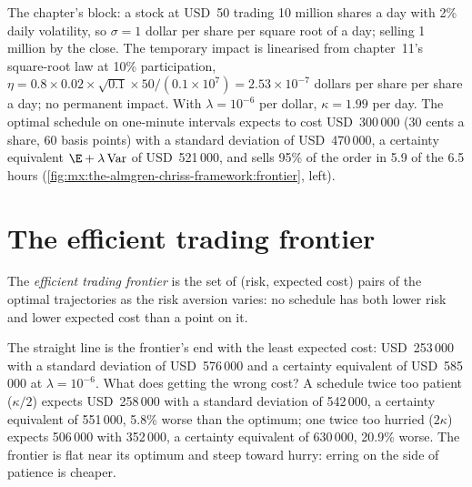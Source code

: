 \label{lst:mx:the-almgren-chriss-framework:ac}

The chapter's block: a stock at USD~50 trading 10 million shares a day with 2\% daily volatility, so $\sigma=1$ dollar per share per square root of a day;
selling 1 million by the close. The temporary impact is linearised from chapter~11's square-root law at 10\% participation,
$\eta=0.8\times0.02\times\sqrt{0.1}\times50/(0.1\times10^7)=2.53\times10^{-7}$ dollars per share per share a day; no permanent impact. With $\lambda=10^{-6}$ per
dollar, $\kappa=1.99$ per day. The optimal schedule on one-minute intervals expects to cost USD~300\,000 (30 cents a share, 60 basis points) with a
standard deviation of USD~470\,000, a certainty equivalent $\E+\lambda\operatorname{Var}$ of USD~521\,000, and sells 95\% of the order in 5.9 of the 6.5 hours
(\cref{fig:mx:the-almgren-chriss-framework:frontier}, left).

\section{The efficient trading frontier}

\begin{definition}\label{def:mx:the-almgren-chriss-framework:frontier}
The \emph{efficient trading frontier} is the set of (risk, expected cost) pairs of the optimal trajectories as the risk
aversion varies: no schedule has both lower risk and lower expected cost than a point on it.
\end{definition}

The straight line is the frontier's end with the least expected cost: USD~253\,000 with a standard deviation of USD~576\,000 and a certainty equivalent of
USD~585\,000 at $\lambda=10^{-6}$. What does getting the  wrong cost? A schedule twice too patient ($\kappa/2$) expects USD~258\,000 with a standard
deviation of 542\,000, a certainty equivalent of 551\,000, 5.8\% worse than the optimum; one twice too hurried ($2\kappa$) expects 506\,000 with 352\,000, a
certainty equivalent of 630\,000, 20.9\% worse. The frontier is flat near its optimum and steep toward hurry: erring on the side of patience is cheaper.

